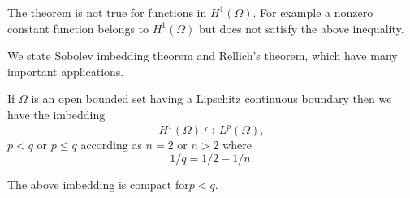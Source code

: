 \begin{REM}\label{chap1:rem1}
The theorem is not true for functions in $H^1(\Omega)$. For example a
nonzero constant function belongs to $H^1(\Omega)$ but does not
satisfy the above inequality.

We state Sobolev imbedding theorem and Rellich's theorem, which have
many important applications. 
\end{REM}

\setcounter{sobolev}{3}
\begin{sobolev}\label{chap1:sobo4}
If $\Omega$ is an open bounded set having a Lipschitz continuous
boundary then we have the imbedding 
$$
H^1(\Omega)\hookrightarrow L^p(\Omega),
$$
$p < q$ or $p \leq q$ according as $n=2$ or $n>2$ where 
$$
1/q=1/2-1/n.
$$
\end{sobolev}

\setcounter{rellich}{4}
\begin{rellich}\label{chap1:rell5}
The above imbedding is compact for\break $p < q$. 
\end{rellich}

